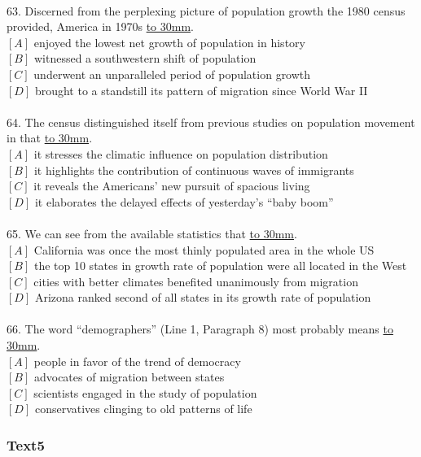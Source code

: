 \documentclass[a4paper]{article}
\begin{document}
\\63.	Discerned from the perplexing picture of population growth the 1980 census provided, America in 1970s \underline{\hbox to 30mm{}}.\\$[A]$ enjoyed the lowest net growth of population in history\\$[B]$ witnessed a southwestern shift of population\\$[C]$ underwent an unparalleled period of population growth\\$[D]$ brought to a standstill its pattern of migration since World War II\\\\64.	The census distinguished itself from previous studies on population movement in that \underline{\hbox to 30mm{}}.\\$[A]$ it stresses the climatic influence on population distribution\\$[B]$ it highlights the contribution of continuous waves of immigrants\\$[C]$ it reveals the Americans’ new pursuit of spacious living\\$[D]$ it elaborates the delayed effects of yesterday’s “baby boom”\\\\65.	We can see from the available statistics that \underline{\hbox to 30mm{}}.\\$[A]$ California was once the most thinly populated area in the whole US\\$[B]$ the top 10 states in growth rate of population were all located in the West\\$[C]$ cities with better climates benefited unanimously from migration\\$[D]$ Arizona ranked second of all states in its growth rate of population\\\\66.	The word “demographers” (Line 1, Paragraph 8) most probably means \underline{\hbox to 30mm{}}.\\$[A]$ people in favor of the trend of democracy\\$[B]$ advocates of migration between states\\$[C]$ scientists engaged in the study of population\\$[D]$ conservatives clinging to old patterns of life\\\subsubsection{Text5}
\end{document}
